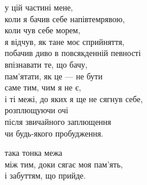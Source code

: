 у цій частині мене,\\
коли я бачив себе напівтемрявою,\\
коли чув себе морем,\\
я відчув, як тане моє сприйняття,\\
побачив диво в повсякденній певності\\
впізнавати те, що бачу,\\
пам'ятати, як це — не бути\\
саме тим, чим я не є,\\
і ті межі, до яких я ще не сягнув себе,\\
розплющуючи очі\\
після звичайного заплющення\\
чи будь-якого пробудження.

така тонка межа\\
між тим, доки сягає моя пам'ять,\\
і забуттям, що прийде.
